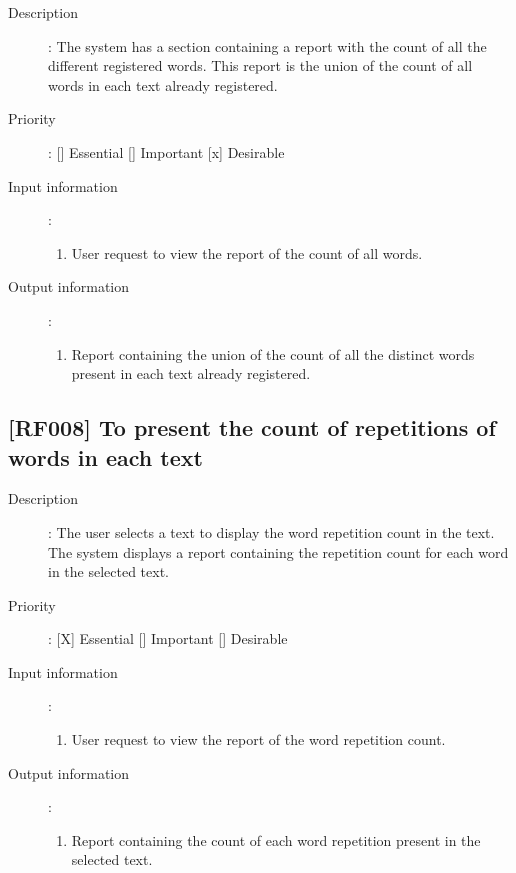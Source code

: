 \documentclass[11pt, twoside, a4paper]{book}
\begin{document}
				\begin{description}
					
					\item[Description]: The system has a section containing a report with the count of all the different registered words. This report is the union of the count of all words in each text already registered.
					\item[Priority]: [] Essential [] Important [x] Desirable
					\item[Input information]:
						\begin{enumerate}

							\item User request to view the report of the count of all words.
							
						\end{enumerate}
					\item[Output information]:
						\begin{enumerate}

							\item Report containing the union of the count of all the distinct words present in each text already registered.
																					
						\end{enumerate}
	
				\end{description}
		
			\subsection{[RF008] To present the count of repetitions of words in each text}
				
				\begin{description}

					\item[Description]: The user selects a text to display the word repetition count in the text. The system displays a report containing the repetition count for each word in the selected text.
					\item[Priority]: [X] Essential [] Important [] Desirable
					\item[Input information]:
						\begin{enumerate}

							\item User request to view the report of the word repetition count.
							
						\end{enumerate}
					\item[Output information]:
						\begin{enumerate}

							\item Report containing the count of each word repetition present in the selected text.
																					
						\end{enumerate}
	
				\end{description}
\end{document}

